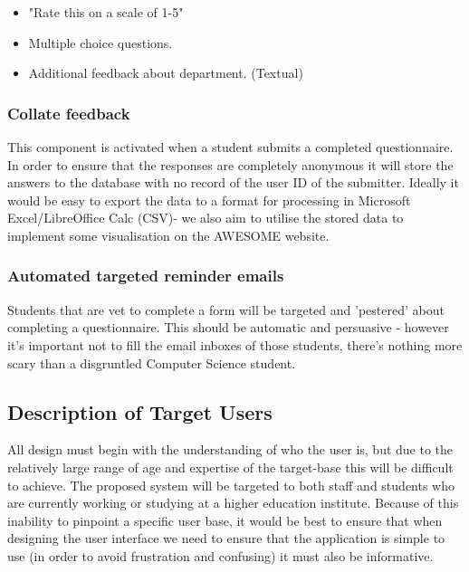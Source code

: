 \documentclass[11pt,a4paper]{article}
\begin{document}
\begin{itemize}
	\item "Rate this on a scale of 1-5"
	\item Multiple choice questions.
	\item Additional feedback about department. (Textual)
\end{itemize}

\subsubsection{Collate feedback}

This component is activated when a student submits a completed questionnaire. In order to ensure that the responses are completely anonymous it will store the answers to the database with no record of the user ID of the submitter. Ideally it would be easy to export the data to a format for processing in Microsoft Excel/LibreOffice Calc (CSV)- we also aim to utilise the stored data to implement some visualisation on the AWESOME website.

\subsubsection{Automated targeted reminder emails}

Students that are vet to complete a form will be targeted and 'pestered' about completing a questionnaire. This should be automatic and persuasive - however it's important not to fill the email inboxes of those students, there's nothing more scary than a disgruntled Computer Science student.

\subsection{Description of Target Users}

All design must begin with the understanding of who the user is, but due to the relatively large range of age and expertise of the target-base this will be difficult to achieve. The proposed system will be targeted to both staff and students who are currently working or studying at a higher education institute. Because of this inability to pinpoint a specific user base, it would be best to ensure that when designing the user interface we need to ensure that the application is simple to use (in order to avoid frustration and confusing) it must also be informative.

\clearpage
\end{document}
